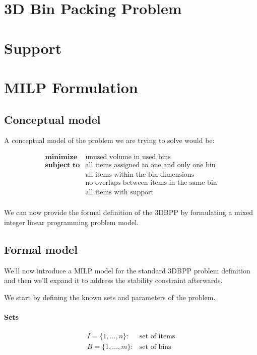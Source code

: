 \section{3D Bin Packing Problem}

\section{Support} %

\section{MILP Formulation}
\label{sec:milp}%
\subsection*{Conceptual model}
A conceptual model of the problem we are trying to solve would be:

\begin{eqnarray*}
    \textbf{minimize} & \text{unused volume in used bins} \\
    \textbf{subject to} & \text{all items assigned to one and only one bin} \\
                                      & \text{all items within the bin dimensions} \\
                                      & \text{no overlaps between items in the same bin} \\
                                      & \text{all items with support} \\
\end{eqnarray*}

We can now provide the formal definition of the 3DBPP by formulating a mixed integer linear programming problem model.

\subsection*{Formal model}
\label{ssec:formal_model}
We'll now introduce a MILP model for the standard 3DBPP problem definition and then we'll expand it to address the stability constraint afterwards.

We start by defining the known sets and parameters of the problem.
\paragraph*{Sets}
\begin{eqnarray*}
    I = \{1,\dots, n \}: & \text{set of items} \\
    B = \{1,\dots, m \}: & \text{set of bins} 
\end{eqnarray*}
